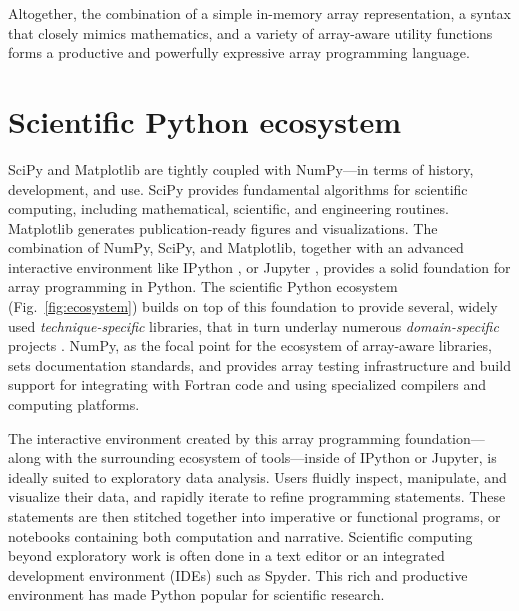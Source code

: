 Altogether, the combination of a simple in-memory array
representation, a syntax that closely mimics mathematics, and a
variety of array-aware utility functions forms a productive and
powerfully expressive array programming language.

\section*{Scientific Python ecosystem}

SciPy and Matplotlib are tightly coupled with NumPy---in terms of
history, development, and use.
SciPy provides fundamental algorithms for scientific computing,
including mathematical, scientific, and engineering routines.
Matplotlib generates publication-ready figures and visualizations.
The combination of NumPy, SciPy, and Matplotlib, together with
an advanced interactive environment like IPython \cite{perez2007ipython},
or Jupyter \cite{Kluyver:2016aa}, provides a solid foundation for array
programming in Python.
The scientific Python ecosystem (Fig.~\ref{fig:ecosystem}) builds on top of
this foundation to provide several, widely used \emph{technique-specific}
libraries\cite{pedregosa2011scikit,vanderwalt2014scikit,SciPyProceedings_11},
that in turn underlay numerous \emph{domain-specific} projects
\cite{astropy:2013,astropy:2018,cock2009biopython,millman2007analysis,sunpy2015,2018EGUGA..2012146H}.
NumPy, as the focal point for the ecosystem of array-aware libraries,
sets documentation standards, and provides array testing infrastructure
and build support for integrating with Fortran code and using specialized
compilers and computing platforms.

The interactive environment created by this array programming
foundation---along with the surrounding ecosystem of tools---inside of
IPython or Jupyter, is ideally suited to exploratory data analysis.
Users fluidly inspect, manipulate, and visualize their data, and
rapidly iterate to refine programming statements. These statements are
then stitched together into imperative or functional programs, or
notebooks containing both computation and narrative.
Scientific computing beyond exploratory work is often done in a text editor
or an integrated development environment (IDEs) such as Spyder.
This rich and productive environment has made Python popular
for scientific research.

